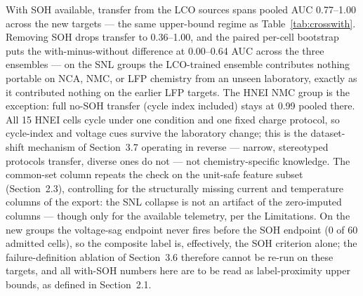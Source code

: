 \documentclass[preprint,12pt]{elsarticle}
\begin{document}
With SOH available, transfer from the LCO sources spans pooled AUC 0.77--1.00 across the new targets --- the same upper-bound regime as Table~\ref{tab:crosswith}. Removing SOH drops transfer to 0.36--1.00, and the paired per-cell bootstrap puts the with-minus-without difference at 0.00--0.64 AUC across the three ensembles --- on the SNL groups the LCO-trained ensemble contributes nothing portable on NCA, NMC, or LFP chemistry from an unseen laboratory, exactly as it contributed nothing on the earlier LFP targets. The HNEI NMC group is the exception: full no-SOH transfer (cycle index included) stays at 0.99 pooled there. All 15 HNEI cells cycle under one condition and one fixed charge protocol, so cycle-index and voltage cues survive the laboratory change; this is the dataset-shift mechanism of Section~3.7 operating in reverse --- narrow, stereotyped protocols transfer, diverse ones do not --- not chemistry-specific knowledge. The common-set column repeats the check on the unit-safe feature subset (Section~2.3), controlling for the structurally missing current and temperature columns of the export: the SNL collapse is not an artifact of the zero-imputed columns --- though only for the available telemetry, per the Limitations. On the new groups the voltage-sag endpoint never fires before the SOH endpoint (0 of 60 admitted cells), so the composite label is, effectively, the SOH criterion alone; the failure-definition ablation of Section~3.6 therefore cannot be re-run on these targets, and all with-SOH numbers here are to be read as label-proximity upper bounds, as defined in Section~2.1.
\end{document}
